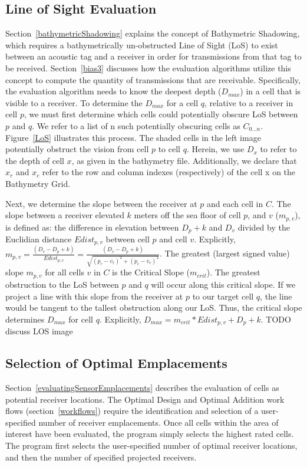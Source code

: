 \subsection {Line of Sight Evaluation}
\label{LoSAlgorithm}
Section~\ref{bathymetricShadowing} explains the concept of Bathymetric Shadowing, which requires a bathymetrically un-obstructed Line of Sight (LoS) to exist between an acoustic tag and a receiver in order for transmissions from that tag to be received.  Section~\ref{bias3} discusses how the evaluation algorithms utilize this concept to compute the quantity of transmissions that are receivable.  Specifically, the evaluation algorithm needs to know the deepest depth ($D_{max}$) in a cell that is visible to a receiver.  To determine the $D_{max}$ for a cell $q$, relative to a receiver in cell $p$, we must first determine which cells could potentially obscure LoS between $p$ and $q$.  We refer to a list of n such potentially obscuring cells as $C_{0...n}$.   Figure~\ref{LoS} illustrates this process.  The shaded cells in the left image potentially obstruct the vision from cell $p$ to cell $q$.  Herein, we use $D_x$ to refer to the depth of cell $x$, as given in the bathymetry file.  Additionally, we declare that $x_r$ and $x_c$ refer to the row and column indexes (respectively) of the cell x on the Bathymetry Grid.

Next, we determine the slope between the receiver at $p$ and each cell in $C$.  The slope between a receiver elevated $k$ meters off the sea floor of cell $p$, and $v$  ($m_{p,v}$), is defined as: the difference in elevation between $D_p + k$ and $D_v$ divided by the Euclidian distance $Edist_{p,v}$ between cell $p$ and cell $v$.  Explicitly, $m_{p,v} = \frac{(D_v - D_p + k)}{Edist_{p,v}} = \frac{(D_v - D_p + k)}{\sqrt{(p_r - v_r )^2 + (p_c - v_c)^2}}$.  The greatest (largest signed value) slope $m_{p,v}$ for all cells $v$ in $C$ is the Critical Slope ($m_{crit}$).  The greatest obstruction to the LoS between $p$ and $q$ will occur along this critical slope.  If we project a line with this slope from the receiver at $p$ to our target cell $q$, the line would be tangent to the tallest obstruction along our LoS.  Thus, the critical slope determines $D_{max}$ for cell $q$.  Explicitly, $D_{max} = m_{crit} * Edist_{p,v} + D_p + k$.
TODO discuss LOS image

\subsection{Selection of Optimal Emplacements}
\label{selectionOfOptimalEmplacements}
Section~\ref{evaluatingSensorEmplacements} describes the evaluation of cells as potential receiver locations.  The Optimal Design and Optimal Addition work flows (section~\ref{workflows}) require the identification and selection of a user-specified number of receiver emplacements.  Once all cells within the area of interest have been evaluated, the program simply selects the highest rated cells.  The program first selects the user-specified number of optimal receiver locations, and then the number of specified projected receivers.


